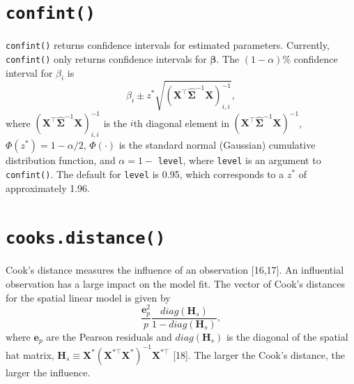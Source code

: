 \documentclass[10pt,letterpaper]{article}
\begin{document}
\hypertarget{sec:confint}{%
\section{\texorpdfstring{\texttt{confint()}}{confint()}}\label{sec:confint}}

\texttt{confint()} returns confidence intervals for estimated
parameters. Currently, \texttt{confint()} only returns confidence
intervals for \(\boldsymbol{\beta}\). The \((1 - \alpha)\)\% confidence
interval for \(\beta_i\) is \begin{equation*}
\hat{\beta}_i \pm z^* \sqrt{(\mathbf{X}^\top \hat{\boldsymbol{\Sigma}}^{-1} \mathbf{X})^{-1}_{i, i}},
\end{equation*} where
\((\mathbf{X}^\top \hat{\boldsymbol{\Sigma}}^{-1} \mathbf{X})^{-1}_{i, i}\)
is the \(i\)th diagonal element in
\((\mathbf{X}^\top \hat{\boldsymbol{\Sigma}}^{-1} \mathbf{X})^{-1}\),
\(\Phi(z^*) = 1 - \alpha / 2\), \(\Phi(\cdot)\) is the standard normal
(Gaussian) cumulative distribution function, and \(\alpha = 1 -\)
\texttt{level}, where \texttt{level} is an argument to
\texttt{confint()}. The default for \texttt{level} is 0.95, which
corresponds to a \(z^*\) of approximately 1.96.

\hypertarget{sec:cooks}{%
\section{\texorpdfstring{\texttt{cooks.distance()}}{cooks.distance()}}\label{sec:cooks}}

Cook's distance measures the influence of an observation {[}16,17{]}. An
influential observation has a large impact on the model fit. The vector
of Cook's distances for the spatial linear model is given by
\begin{equation} \label{eq:cooksd}
\frac{\mathbf{e}_p^2}{p}\frac{diag(\mathbf{H}_s)}{1 - diag(\mathbf{H}_s)},
\end{equation} where \(\mathbf{e}_p\) are the Pearson residuals and
\(diag(\mathbf{H}_s)\) is the diagonal of the spatial hat matrix,
\(\mathbf{H}_s \equiv \mathbf{X}^* (\mathbf{X}^{* \top} \mathbf{X}^*)^{-1} \mathbf{X}^{* \top}\)
{[}18{]}. The larger the Cook's distance, the larger the influence.
\end{document}
